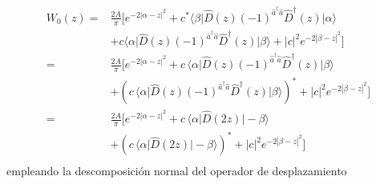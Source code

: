 \begin{align*}
  W_0(z) = & \frac{2A}{\pi} \bigg[ e^{-2|\alpha - z|^2} + c^* \langle \beta \vert \hat{D}(z) (-1)^{\hat{a}^\dagger \hat{a}} \hat{D}^\dagger(z) \vert\alpha\rangle                                                                                                                          \\ & + c \langle \alpha\vert \hat{D}(z) (-1)^{\hat{a}^\dagger \hat{a}} \hat{D}^\dagger(z) \vert\beta\rangle + |c|^2 e^{-2|\beta - z|^2} \bigg] \\ 
 = & \frac{2A}{\pi} \bigg[ e^{-2|\alpha - z|^2} +  c \,\langle \alpha\vert \hat{D}(z) (-1)^{\hat{a}^\dagger \hat{a}} \hat{D}^\dagger(z) \vert\beta\rangle                                                                                                                         \\ & + \left(c \,\langle \alpha\vert \hat{D}(z) (-1)^{\hat{a}^\dagger \hat{a}} \hat{D}^\dagger(z) \vert\beta\rangle\right)^{*} + |c|^2 e^{-2|\beta - z|^2} \bigg] \\ 
 = & \frac{2A}{\pi} \bigg[ e^{-2|\alpha - z|^2} +  c \,\langle \alpha\vert \hat{D}(2z) \vert-\beta\rangle  \\ & + \left(c \,\langle \alpha\vert \hat{D}(2z) \vert-\beta\rangle\right)^{*} + |c|^2 e^{-2|\beta - z|^2} \bigg] \\
\end{align*}
empleando la descomposición normal del operador de desplazamiento
